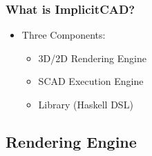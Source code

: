 \documentclass{beamer}
\begin{document}
\begin{frame}
\frametitle{What is ImplicitCAD?}
\begin{itemize}
\item Three Components:
  \begin{itemize}
  \item 3D/2D Rendering Engine
  \item SCAD Execution Engine
  \item Library (Haskell DSL)
  \end{itemize}
\end{itemize}
\end{frame}


\subsection{Rendering Engine}
\end{document}
